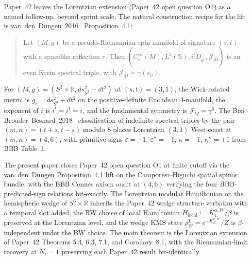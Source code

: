 \documentclass[11pt,a4paper]{article}
\theoremstyle{plain}
\theoremstyle{definition}
\newcommand{\Nt}{N_t}
\newcommand{\sthree}{S^{3}}
\newcommand{\R}{\mathbb{R}}
\newcommand{\KL}{K_{L}}
\begin{document}
Paper~42 leaves the Lorentzian extension (Paper~42 open question O1)
as a named follow-up, beyond sprint scale. The natural construction recipe
for the lift is van~den~Dungen~2016~\cite{vandungen2016} Proposition~4.1:

\begin{quote}
Let $(M, g)$ be a pseudo-Riemannian spin manifold of signature
$(s, t)$ with a spacelike reflection $r$. Then
$(C^\infty_c(M), L^2(\mathbb{S}), i^t \not{\!\!D}_{g_r}, \mathcal{J}_M)$
is an even Krein spectral triple, with
$\mathcal{J}_M = \gamma(e_0)$.
\end{quote}

For $(M, g) = (\sthree \times \R, ds^2_{\sthree} - dt^2)$ at
$(s, t) = (3, 1)$, the Wick-rotated metric is
$g_r = ds^2_{\sthree} + dt^2$ on the positive-definite Euclidean
4-manifold, the exponent of $i$ is $i^t = i^1 = i$, and the
fundamental symmetry is $\mathcal{J}_M = \gamma^0$. The
Bizi--Brouder--Besnard~2018~\cite{bizi_brouder_besnard2018}
classification of indefinite spectral triples by the pair
$(m, n) = (t + s, t - s)$ modulo 8 places Lorentzian $(3, 1)$
West-coast at $(m, n) = (4, 6)$, with primitive signs
$\varepsilon = +1$, $\varepsilon'' = -1$, $\kappa = -1$,
$\kappa'' = +1$ from BBB Table~1.

The present paper closes Paper~42 open question O1 at finite cutoff
via the van~den~Dungen Proposition~4.1 lift on the Camporesi--Higuchi
spatial spinor bundle, with the BBB Connes axiom audit at $(4, 6)$
verifying the four BBB-predicted-sign relations bit-exactly. The
Lorentzian modular Hamiltonian on the hemispheric wedge of $\sthree
\times \R$ inherits the Paper~42 wedge structure verbatim with a
temporal slot added, the BW choice of local Hamiltonian
$H_{\mathrm{local}} := \KL^{\alpha, W} / \beta$ is preserved at the
Lorentzian level, and the wedge KMS state $\rho_W^L = e^{-\KL^{\alpha,
W}}/Z$ is $\beta$-independent under the BW choice. The main theorem is
the Lorentzian extension of Paper~42 Theorems 5.4, 6.3, 7.1, and
Corollary~8.1, with the Riemannian-limit recovery at $\Nt = 1$
preserving each Paper~42 result bit-identically.
\end{document}

